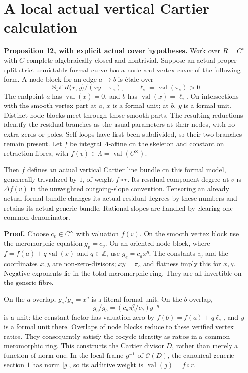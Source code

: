 \documentclass[
  11pt,
]{article}
\begin{document}
\section{A local actual vertical Cartier
calculation}\label{a-local-actual-vertical-cartier-calculation}

\textbf{Proposition 12, with explicit actual cover hypotheses.} Work
over \(R=C^\circ\) with \(C\) complete algebraically closed and
nontrivial. Suppose an actual proper split strict semistable formal
curve has a node-and-vertex cover of the following form. A node block
for an edge \(a\to b\) is étale over \[
 \operatorname{Spf}R\langle x,y\rangle/(xy-\pi_e),\qquad
 \ell_e=\operatorname{val}(\pi_e)>0.
\] The endpoint \(a\) has \(\operatorname{val}(x)=0\), and \(b\) has
\(\operatorname{val}(x)=\ell_e\). On intersections with the smooth
vertex part at \(a\), \(x\) is a formal unit; at \(b\), \(y\) is a
formal unit. Distinct node blocks meet through those smooth parts. The
resulting reductions identify the residual branches as the usual
parameters at their nodes, with no extra zeros or poles. Self-loops have
first been subdivided, so their two branches remain present. Let \(f\)
be integral \(\Lambda\)-affine on the skeleton and constant on
retraction fibres, with \(f(v)\in\Lambda=\operatorname{val}(C^\times)\).

Then \(f\) defines an actual vertical Cartier line bundle on this formal
model, generically trivialized by \(1\), of weight \(f\circ r\). Its
residual component degree at \(v\) is \(\Delta f(v)\) in the unweighted
outgoing-slope convention. Tensoring an already actual formal bundle
changes its actual residual degrees by these numbers and retains its
actual generic bundle. Rational slopes are handled by clearing one
common denominator.

\textbf{Proof.} Choose \(c_v\in C^\times\) with valuation \(f(v)\). On
the smooth vertex block use the meromorphic equation \(g_v=c_v\). On an
oriented node block, where \(f=f(a)+q\operatorname{val}(x)\) and
\(q\in\mathbb Z\), use \(g_e=c_a x^q\). The constants \(c_v\) and the
coordinates \(x,y\) are non-zero-divisors; \(xy=\pi_e\) and flatness
imply this for \(x,y\). Negative exponents lie in the total meromorphic
ring. They are all invertible on the generic fibre.

On the \(a\) overlap, \(g_e/g_a=x^q\) is a literal formal unit. On the
\(b\) overlap, \[
 g_e/g_b=(c_a\pi_e^q/c_b)y^{-q}
\] is a unit: the constant factor has valuation zero by
\(f(b)=f(a)+q\ell_e\), and \(y\) is a formal unit there. Overlaps of
node blocks reduce to these verified vertex ratios. They consequently
satisfy the cocycle identity as ratios in a common meromorphic ring.
This constructs the Cartier divisor \(D\), rather than merely a function
of norm one. In the local frame \(g^{-1}\) of \(\mathcal O(D)\), the
canonical generic section \(1\) has norm \(|g|\), so its additive weight
is \(\operatorname{val}(g)=f\circ r\).
\end{document}
